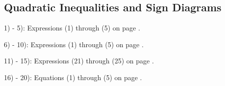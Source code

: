 \newpage



\subsection{Quadratic Inequalities and Sign Diagrams}

{}\pp

1) - 5): Expressions (1) through (5) on page \pageref{ais1}.\pp

6) - 10): Expressions (1) through (5) on page \pageref{aisnot1}.\pp

11) - 15): Expressions (21) through (25) on page \pageref{aisnot1}.\pp

16) - 20): Equations (1) through (5) on page \pageref{QF}.\pp
